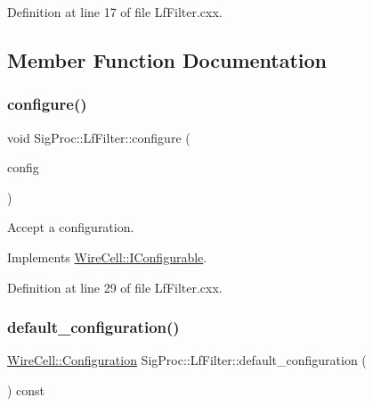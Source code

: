 Definition at line 17 of file Lf\+Filter.\+cxx.



\subsection{Member Function Documentation}
\mbox{\label{class_wire_cell_1_1_sig_proc_1_1_lf_filter_afb4e1b2ea202e9df9fc3aa1399171506}} 
\subsubsection{\texorpdfstring{configure()}{configure()}}
{\footnotesize\ttfamily void Sig\+Proc\+::\+Lf\+Filter\+::configure (\begin{DoxyParamCaption}\item[{const \hyperlink{namespace_wire_cell_a9f705541fc1d46c608b3d32c182333ee}{Wire\+Cell\+::\+Configuration} \&}]{config }\end{DoxyParamCaption})\hspace{0.3cm}{\ttfamily [virtual]}}



Accept a configuration. 



Implements \hyperlink{class_wire_cell_1_1_i_configurable_a57ff687923a724093df3de59c6ff237d}{Wire\+Cell\+::\+I\+Configurable}.



Definition at line 29 of file Lf\+Filter.\+cxx.

\mbox{\label{class_wire_cell_1_1_sig_proc_1_1_lf_filter_a1a6475fbf1b682840d50b653f86915ca}} 
\subsubsection{\texorpdfstring{default\+\_\+configuration()}{default\_configuration()}}
{\footnotesize\ttfamily \hyperlink{namespace_wire_cell_a9f705541fc1d46c608b3d32c182333ee}{Wire\+Cell\+::\+Configuration} Sig\+Proc\+::\+Lf\+Filter\+::default\+\_\+configuration (\begin{DoxyParamCaption}{ }\end{DoxyParamCaption}) const\hspace{0.3cm}{\ttfamily [virtual]}}



